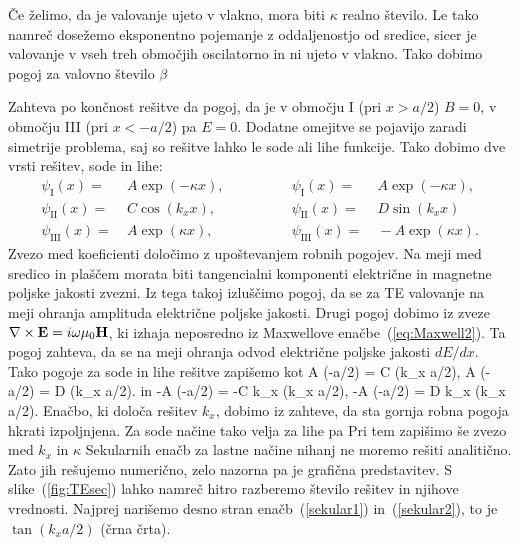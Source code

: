 Če želimo, da je valovanje ujeto v vlakno, mora biti $\kappa$ realno število.
Le tako namreč dosežemo eksponentno pojemanje z oddaljenostjo od sredice,
sicer je valovanje v vseh treh območjih oscilatorno in ni ujeto v vlakno. 
Tako dobimo pogoj za valovno število $\beta$

Zahteva po končnost rešitve da pogoj, da je v območju I (pri $x>a/2$) $B=0$, 
v območju III (pri $x<-a/2$) pa $E=0$. Dodatne omejitve se pojavijo zaradi 
simetrije problema, saj so rešitve lahko le sode ali lihe funkcije. Tako 
dobimo dve vrsti rešitev, sode in lihe:
\begin{align}
\psi_{\mathrm{I}}(x) =&~ A \exp(-\kappa x), \qquad \qquad &\psi_{\mathrm{I}}(x) =&~ A \exp(-\kappa x),\\
\psi_{\mathrm{II}}(x) =&~ C \cos(k_x x), \qquad \qquad &\psi_{\mathrm{II}}(x) =&~ D \sin(k_x x)\\
\psi_{\mathrm{III}}(x) =&~ A \exp(\kappa x), \qquad \qquad &\psi_{\mathrm{III}}(x) =&~ -A \exp(\kappa x).
\end{align}
Zvezo med koeficienti določimo z upoštevanjem robnih pogojev. Na meji
med sredico in plaščem morata biti tangencialni komponenti 
električne in magnetne poljske jakosti zvezni. Iz tega takoj 
izluščimo pogoj, da se za TE valovanje na meji ohranja amplituda električne poljske jakosti.
Drugi pogoj dobimo iz zveze $\nabla\times{\bf E}=i\omega\mu_{0}{\bf H}$, ki izhaja
neposredno iz Maxwellove enačbe~(\ref{eq:Maxwell2}). Ta pogoj zahteva, da se na meji ohranja
odvod električne poljske jakosti $dE/dx$. Tako pogoje za sode in lihe rešitve zapišemo kot
\beq
A \exp(-\kappa a/2) = C \cos(k_x a/2), \qquad \qquad A \exp(-\kappa a/2) = D \sin(k_x a/2).
\eeq
in 
\beq
-A \kappa \exp(-\kappa a/2) = -C k_x \sin(k_x a/2), \qquad
-\kappa A \exp(-\kappa a/2) = D k_x \cos(k_x a/2).
\eeq
Enačbo, ki določa rešitev $k_x$, dobimo iz zahteve, da sta gornja robna pogoja hkrati izpoljnjena. Za sode 
načine tako velja
za lihe pa 
Pri tem zapišimo še zvezo med $k_x$ in $\kappa$
Sekularnih enačb za lastne načine nihanj ne moremo rešiti analitično. Zato jih rešujemo numerično,
zelo nazorna pa je grafična predstavitev. S slike~(\ref{fig:TEsec}) lahko namreč hitro razberemo
število rešitev in njihove vrednosti. Najprej narišemo desno stran enačb~(\ref{sekular1}) 
in~(\ref{sekular2}), to je $\tan (k_x a/2)$ (črna črta). 
